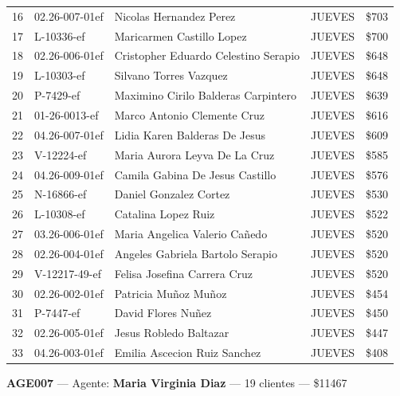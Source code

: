 \documentclass[11pt,a4paper]{article}
\newcommand{\money}[1]{\$\num{#1}}
\begin{document}
\begin{center}
\begin{longtable}{rlp{6.5cm}lr}
16 & 02.26-007-01ef & Nicolas Hernandez Perez & JUEVES & \money{703} \\
17 & L-10336-ef & Maricarmen Castillo Lopez & JUEVES & \money{700} \\
18 & 02.26-006-01ef & Cristopher Eduardo Celestino Serapio & JUEVES & \money{648} \\
19 & L-10303-ef & Silvano Torres Vazquez & JUEVES & \money{648} \\
20 & P-7429-ef & Maximino Cirilo Balderas Carpintero & JUEVES & \money{639} \\
21 & 01-26-0013-ef & Marco Antonio Clemente Cruz & JUEVES & \money{616} \\
22 & 04.26-007-01ef & Lidia Karen Balderas De Jesus & JUEVES & \money{609} \\
23 & V-12224-ef & Maria Aurora Leyva De La Cruz & JUEVES & \money{585} \\
24 & 04.26-009-01ef & Camila Gabina De Jesus Castillo & JUEVES & \money{576} \\
25 & N-16866-ef & Daniel Gonzalez Cortez & JUEVES & \money{530} \\
26 & L-10308-ef & Catalina Lopez Ruiz & JUEVES & \money{522} \\
27 & 03.26-006-01ef & Maria Angelica Valerio Cañedo & JUEVES & \money{520} \\
28 & 02.26-004-01ef & Angeles Gabriela Bartolo Serapio & JUEVES & \money{520} \\
29 & V-12217-49-ef & Felisa Josefina Carrera Cruz & JUEVES & \money{520} \\
30 & 02.26-002-01ef & Patricia Muñoz Muñoz & JUEVES & \money{454} \\
31 & P-7447-ef & David Flores Nuñez & JUEVES & \money{450} \\
32 & 02.26-005-01ef & Jesus Robledo Baltazar & JUEVES & \money{447} \\
33 & 04.26-003-01ef & Emilia Ascecion Ruiz Sanchez & JUEVES & \money{408} \\

\bottomrule
\end{longtable}
\end{center}
\noindent\textbf{AGE007} --- Agente: \textbf{Maria Virginia Diaz} --- 19 clientes --- \money{11467}
\end{document}
